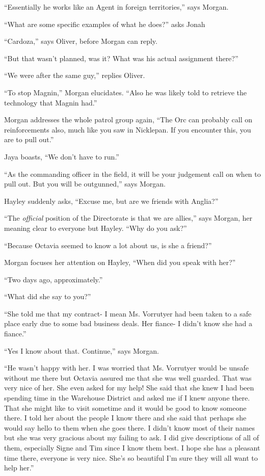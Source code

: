 ``Essentially he works like an Agent in foreign territories,'' says Morgan.

``What are some specific examples of what he does?'' asks Jonah

``Cardoza,'' says Oliver, before Morgan can reply.

``But that wasn't planned, was it?  What was his actual assignment there?''

``We were after the same guy,'' replies Oliver.

``To stop Magnin,'' Morgan elucidates.  ``Also he was likely told to retrieve the technology that Magnin had.''



Morgan addresses the whole patrol group again, ``The Orc can probably call on reinforcements also, much like you saw in Nicklepan.  If you encounter this, you are to pull out.''

Jaya boasts, ``We don't have to run.''

``As the commanding officer in the field, it will be your judgement call on when to pull out.  But you will be outgunned,'' says Morgan.

Hayley suddenly asks, ``Excuse me, but are we friends with Anglia?''

``The \textit{official} position of the Directorate is that we are allies,'' says Morgan, her meaning clear to everyone but Hayley.  ``Why do you ask?''

``Because Octavia seemed to know a lot about us, is she a friend?''

Morgan focuses her attention on Hayley, ``When did you speak with her?''

``Two days ago, approximately.''

``What did she say to you?''

``She told me that my contract- I mean Ms. Vorrutyer had been taken to a safe place early due to some bad business deals.  Her fiance- I didn't know she had a fiance.''

``Yes I know about that. Continue,'' says Morgan.

``He wasn't happy with her.  I was worried that Ms. Vorrutyer would be unsafe without me there but Octavia assured me that she was well guarded.  That was very nice of her.  She even asked for my help!  She said that she knew I had been spending time in the Warehouse District and asked me if I knew anyone there.  That she might like to visit sometime and it would be good to know someone there.  I told her about the people I know there and she said that perhaps she would say hello to them when she goes there.  I didn't know most of their names but she was very gracious about my failing to ask.  I did give descriptions of all of them, especially Signe and Tim since I know them best.  I hope she has a pleasant time there, everyone is very nice.  She's so beautiful I'm sure they will all want to help her.''



